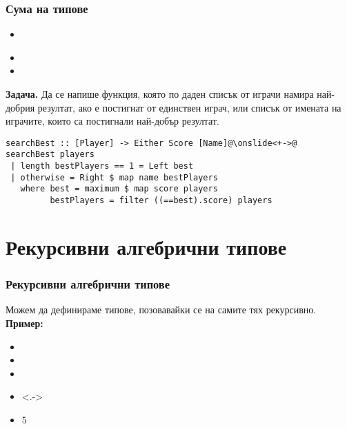 \documentclass[alsotrans]{beamerswitch}
\begin{document}
\begin{frame}[fragile]
  \frametitle{Сума на типове}
  \begin{itemize}[<+->]
  \item {}\\
      \hspace{5em}
  \item {}
  \item {}
  \end{itemize}
  \onslide<+->
  \textbf{Задача.} Да се напише функция, която по даден списък от играчи намира най-добрия резултат, ако е постигнат от единствен играч, или списък от имената на играчите, които са постигнали най-добър резултат.
  \onslide<+->
\begin{lstlisting}
searchBest :: [Player] -> Either Score [Name]@\onslide<+->@
searchBest players
 | length bestPlayers == 1 = Left best
 | otherwise = Right $ map name bestPlayers
   where best = maximum $ map score players
         bestPlayers = filter ((==best).score) players
\end{lstlisting}
\end{frame}

\section{Рекурсивни алгебрични типове}

\begin{frame}[fragile]
  \frametitle{Рекурсивни алгебрични типове}
  Можем да дефинираме типове, позовавайки се на самите тях \alert{рекурсивно}.\\[2ex]
  \pause
  \textbf{Пример:}
  \begin{itemize}[<+->]
  \item {}
  \item {}
  \item {}
  \item<.-> 
  \item {}5
  \end{itemize}
\end{frame}
\end{document}

